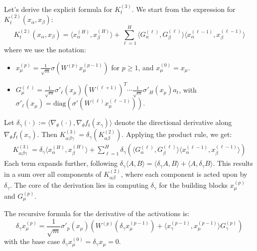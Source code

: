 \documentclass[a4paper]{article}
\begin{document}
Let's derive the explicit formula for $K^{(3)}_t$. We start from the expression for $K^{(2)}_t(x_\alpha, x_\beta)$:
\begin{equation}
K^{(2)}_t(x_\alpha, x_\beta) = \langle x^{(H)}_\alpha, x^{(H)}_\beta \rangle + \sum_{\ell=1}^{H} \langle G^{(\ell)}_\alpha, G^{(\ell)}_\beta \rangle \langle x^{(\ell-1)}_\alpha, x^{(\ell-1)}_\beta \rangle
\end{equation}
where we use the notation:
\begin{itemize}
    \item $x^{(p)}_\mu = \frac{1}{\sqrt{m}}\sigma(W^{(p)} x^{(p-1)}_\mu)$ for $p \ge 1$, and $x^{(0)}_\mu = x_\mu$.
    \item $G^{(\ell)}_\mu = \frac{1}{\sqrt{m}}\sigma'_\ell(x_\mu) (W^{(\ell+1)})^T \cdots \frac{1}{\sqrt{m}}\sigma'_H(x_\mu) a_t$, with $\sigma'_\ell(x_\mu) = \text{diag}(\sigma'(W^{(\ell)}x^{(\ell-1)}_\mu))$.
\end{itemize}

Let $\delta_\gamma(\cdot) := \langle \nabla_\theta (\cdot), \nabla_\theta f_t(x_\gamma) \rangle$ denote the directional derivative along $\nabla_\theta f_t(x_\gamma)$. Then $K^{(3)}_{\alpha\beta\gamma} = \delta_\gamma(K^{(2)}_{\alpha\beta})$. Applying the product rule, we get:
\begin{align}
K^{(3)}_{\alpha\beta\gamma} = \delta_\gamma \langle x^{(H)}_\alpha, x^{(H)}_\beta \rangle + \sum_{\ell=1}^{H} \delta_\gamma \left( \langle G^{(\ell)}_\alpha, G^{(\ell)}_\beta \rangle \langle x^{(\ell-1)}_\alpha, x^{(\ell-1)}_\beta \rangle \right)
\end{align}
Each term expands further, following $\delta_\gamma \langle A, B \rangle = \langle \delta_\gamma A, B \rangle + \langle A, \delta_\gamma B \rangle$. This results in a sum over all components of $K^{(2)}_{\alpha\beta}$, where each component is acted upon by $\delta_\gamma$. The core of the derivation lies in computing $\delta_\gamma$ for the building blocks $x^{(p)}_\mu$ and $G^{(p)}_\mu$.

The recursive formula for the derivative of the activations is:
\begin{equation}
\delta_\gamma x^{(p)}_\mu = \frac{1}{\sqrt{m}} \sigma'_{p}(x_\mu) \left( W^{(p)} (\delta_\gamma x^{(p-1)}_\mu) + \langle x^{(p-1)}_\gamma, x^{(p-1)}_\mu \rangle G^{(p)}_\gamma \right)
\end{equation}
with the base case $\delta_\gamma x^{(0)}_\mu = \delta_\gamma x_\mu = 0$.
\end{document}
